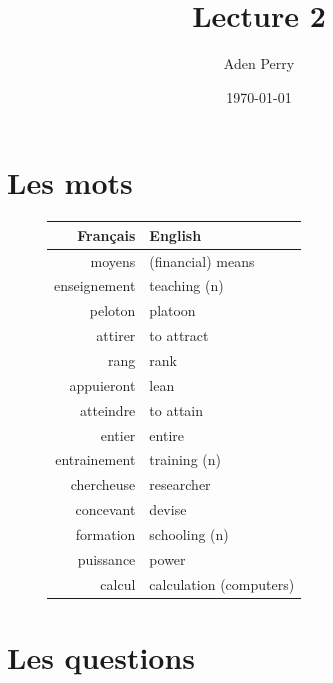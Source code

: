 \documentclass{article}
\title{Lecture 2}
\author{Aden Perry}
\date{\today}
\begin{document}
\maketitle

\section{Les mots}

\begin{figure}[ht]
	\center
	\begin{tabular}{rl}
		Français     & English                 \\
		\hline
		\hline
		moyens       & (financial) means       \\
		enseignement & teaching (n)            \\
		peloton      & platoon                 \\
		attirer      & to attract              \\
		rang         & rank                    \\
		appuieront   & lean                    \\
		atteindre    & to attain               \\
		entier       & entire                  \\
		entrainement & training (n)            \\
		chercheuse   & researcher              \\
		concevant    & devise                  \\
		formation    & schooling (n)           \\
		puissance    & power                   \\
		calcul       & calculation (computers) \\
		\hline
		\hline
	\end{tabular}
\end{figure}

\section{Les questions}
\end{document}
